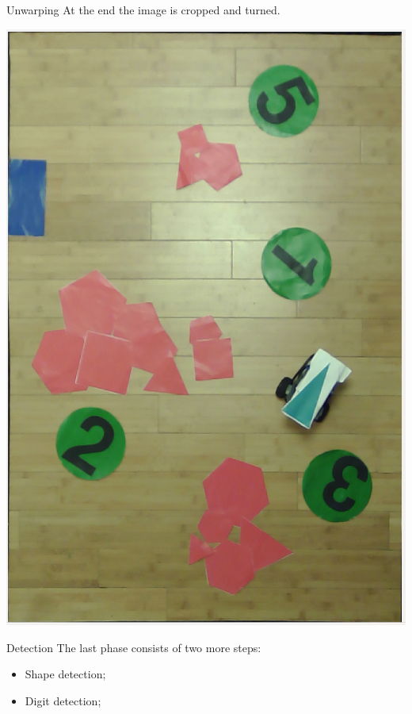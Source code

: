 \begin{frame}[fragile]{Unwarping}
	At the end the image is cropped and turned. 
	\begin{center}
		\includegraphics[scale=0.19]{Immagini/Unwrapped}
	\end{center}
\end{frame}


\begin{frame}[fragile]{Detection}
	The last phase consists of two more steps:
	\begin{itemize}
		\item Shape detection;
		\item Digit detection;
	\end{itemize}
\end{frame}

